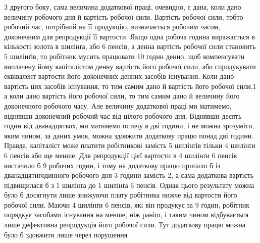 З другого боку, сама величина додаткової праці, очевидно,
є дана, коли дано величину робочого дня й вартість робочої
сили. Вартість робочої сили, тобто робочий час, потрібний на її
продукцію, визначається робочим часом, доконечним для репродукції
її вартости. Якщо одна робоча година виражається в
кількості золота в  шилінґа, або 6 пенсів, а денна вартість робочої
сили становить 5 шилінґів, то робітник мусить працювати
10 годин денно, щоб компенсувати виплачену йому капіталістом
денну вартість його робочої сили, або спродукувати еквівалент
вартости його доконечних денних засобів існування. Коли дано
вартість цих засобів існування, то тим самим дано й вартість його
робочої сили,1 а коли дано вартість його робочої сили, то тим
самим дано й величину його доконечного робочого часу. Але величину
додаткової праці ми матимемо, віднявши доконечний робочий
час від цілого робочого дня. Віднявши десять годин від дванадцятьох,
ми матимемо остачу в дві години, і не можна зрозуміти,
яким чином, за даних умов, можна здовжити додаткову
працю понад дві години. Правда, капіталіст може платити робітникові
замість 5 шилінґів тільки 4 шилінґи 6 пенсів або ще менше.
Для репродукції цієї вартости в 4 шилінґи 6 пенсів вистачило б
9 робочих годин, і тому на додаткову працю припало б із дванадцятигодинного
робочого дня 3 години замість 2, а сама додаткова
вартість підвищилася б з 1 шилінґа до 1 шилінґа 6 пенсів. Однак
цього результату можна було б досягнути лише знижуючи плату
робітника нижче від вартости його робочої сили. Маючи 4 шилінґи
6 пенсів, які він продукує за 9 годин, робітник порядкує
засобами існування на  менше, ніж раніш, і таким чином відбувається
лише дефективна репродукція його робочої сили. Тут
додаткову працю можна було б здовжити лише через порушення

